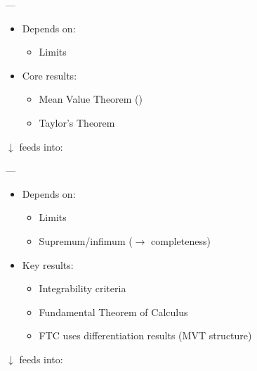 \documentclass[12pt,a4paper]{report}
\begin{document}
\begin{description}
---

\item {}

	\begin{itemize}
    \item Depends on:

		\begin{itemize}
        \item Limits
		\end{itemize}

    \item Core results:

		\begin{itemize}
        \item Mean Value Theorem ()
        \item Taylor’s Theorem
		\end{itemize}

	\end{itemize}
$\downarrow$ feeds into:

---

\item {}

	\begin{itemize}
    \item Depends on:

		\begin{itemize}
        \item Limits
        \item Supremum/infimum ($\to$ completeness)
		\end{itemize}

    \item Key results:

		\begin{itemize}
        \item Integrability criteria
        \item Fundamental Theorem of Calculus
		\end{itemize}


		\begin{itemize}
        \item FTC uses differentiation results (MVT structure)
		\end{itemize}

	\end{itemize}
$\downarrow$ feeds into:


\end{description}
\end{document}
